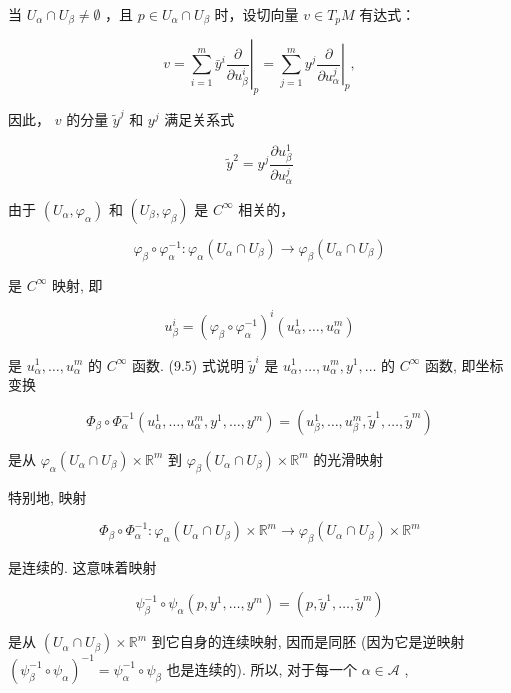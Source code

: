 当  $U_{\alpha} \cap U_{\beta} \neq \emptyset$ ，且  $p \in U_{\alpha} \cap U_{\beta}$  时，设切向量  $v \in T_pM$  有达式：

$$
v = \sum_ {i = 1} ^ {m} \bar {y} ^ {i} \left. \frac {\partial}{\partial u _ {\beta} ^ {i}} \right| _ {p} = \sum_ {j = 1} ^ {m} y ^ {j} \left. \frac {\partial}{\partial u _ {\alpha} ^ {j}} \right| _ {p},
$$

因此，  $v$  的分量  $\tilde{y}^j$  和  $y^{j}$  满足关系式

$$
\tilde {y} ^ {2} = y ^ {j} \frac {\partial u _ {\beta} ^ {1}}{\partial u _ {\alpha} ^ {j}}
$$

由于  $(U_{\alpha},\varphi_{\alpha})$  和  $(U_{\beta},\varphi_{\beta})$  是  $C^\infty$  相关的，

$$
\varphi_ {\beta} \circ \varphi_ {\alpha} ^ {- 1}: \varphi_ {\alpha} (U _ {\alpha} \cap U _ {\beta}) \rightarrow \varphi_ {\beta} (U _ {\alpha} \cap U _ {\beta})
$$

是  $C^\infty$  映射, 即

$$
u _ {\beta} ^ {i} = \left(\varphi_ {\beta} \circ \varphi_ {\alpha} ^ {- 1}\right) ^ {i} \left(u _ {\alpha} ^ {1}, \dots , u _ {\alpha} ^ {m}\right)
$$

是  $u_{\alpha}^{1}, \dots, u_{\alpha}^{m}$  的  $C^{\infty}$  函数. (9.5) 式说明  $\tilde{y}^{i}$  是  $u_{\alpha}^{1}, \dots, u_{\alpha}^{m}, y^{1}, \dots$  的  $C^{\infty}$  函数, 即坐标变换

$$
\Phi_ {\beta} \circ \Phi_ {\alpha} ^ {- 1} \left(u _ {\alpha} ^ {1}, \dots , u _ {\alpha} ^ {m}, y ^ {1}, \dots , y ^ {m}\right) = \left(u _ {\beta} ^ {1}, \dots , u _ {\beta} ^ {m}, \tilde {y} ^ {1}, \dots , \tilde {y} ^ {m}\right)
$$

是从  $\varphi_{\alpha}(U_{\alpha}\cap U_{\beta})\times \mathbb{R}^{m}$  到  $\varphi_{\beta}(U_{\alpha}\cap U_{\beta})\times \mathbb{R}^{m}$  的光滑映射

特别地, 映射

$$
\Phi_ {\beta} \circ \Phi_ {\alpha} ^ {- 1}: \varphi_ {\alpha} (U _ {\alpha} \cap U _ {\beta}) \times \mathbb {R} ^ {m} \rightarrow \varphi_ {\beta} (U _ {\alpha} \cap U _ {\beta}) \times \mathbb {R} ^ {m}
$$

是连续的. 这意味着映射

$$
\psi_ {\beta} ^ {- 1} \circ \psi_ {\alpha} (p, y ^ {1}, \dots , y ^ {m}) = (p, \tilde {y} ^ {1}, \dots , \tilde {y} ^ {m})
$$

是从  $(U_{\alpha} \cap U_{\beta}) \times \mathbb{R}^{m}$  到它自身的连续映射, 因而是同胚 (因为它是逆映射  $(\psi_{\beta}^{-1} \circ \psi_{\alpha})^{-1} = \psi_{\alpha}^{-1} \circ \psi_{\beta}$  也是连续的). 所以, 对于每一个  $\alpha \in \mathcal{A}$ ,

